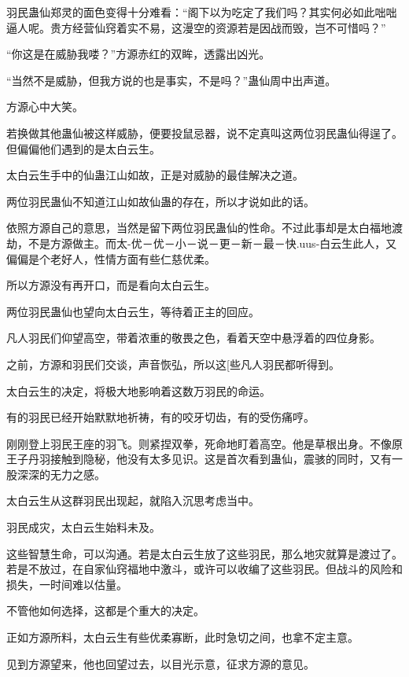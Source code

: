 
\begin{this_body}

羽民蛊仙郑灵的面色变得十分难看：“阁下以为吃定了我们吗？其实何必如此咄咄逼人呢。贵方经营仙窍着实不易，这漫空的资源若是因战而毁，岂不可惜吗？”

“你这是在威胁我喽？”方源赤红的双眸，透露出凶光。

“当然不是威胁，但我方说的也是事实，不是吗？”蛊仙周中出声道。

方源心中大笑。

若换做其他蛊仙被这样威胁，便要投鼠忌器，说不定真叫这两位羽民蛊仙得逞了。但偏偏他们遇到的是太白云生。

太白云生手中的仙蛊江山如故，正是对威胁的最佳解决之道。

两位羽民蛊仙不知道江山如故仙蛊的存在，所以才说如此的话。

依照方源自己的意思，当然是留下两位羽民蛊仙的性命。不过此事却是太白福地渡劫，不是方源做主。而太-优－优－小－说－更－新－最－快.uus-白云生此人，又偏偏是个老好人，性情方面有些仁慈优柔。

所以方源没有再开口，而是看向太白云生。

两位羽民蛊仙也望向太白云生，等待着正主的回应。

凡人羽民们仰望高空，带着浓重的敬畏之色，看着天空中悬浮着的四位身影。

之前，方源和羽民们交谈，声音恢弘，所以这[些凡人羽民都听得到。

太白云生的决定，将极大地影响着这数万羽民的命运。

有的羽民已经开始默默地祈祷，有的咬牙切齿，有的受伤痛哼。

刚刚登上羽民王座的羽飞。则紧捏双拳，死命地盯着高空。他是草根出身。不像原王子丹羽接触到隐秘，他没有太多见识。这是首次看到蛊仙，震骇的同时，又有一股深深的无力之感。

太白云生从这群羽民出现起，就陷入沉思考虑当中。

羽民成灾，太白云生始料未及。

这些智慧生命，可以沟通。若是太白云生放了这些羽民，那么地灾就算是渡过了。若是不放过，在自家仙窍福地中激斗，或许可以收编了这些羽民。但战斗的风险和损失，一时间难以估量。

不管他如何选择，这都是个重大的决定。

正如方源所料，太白云生有些优柔寡断，此时急切之间，也拿不定主意。

见到方源望来，他也回望过去，以目光示意，征求方源的意见。


\end{this_body}
